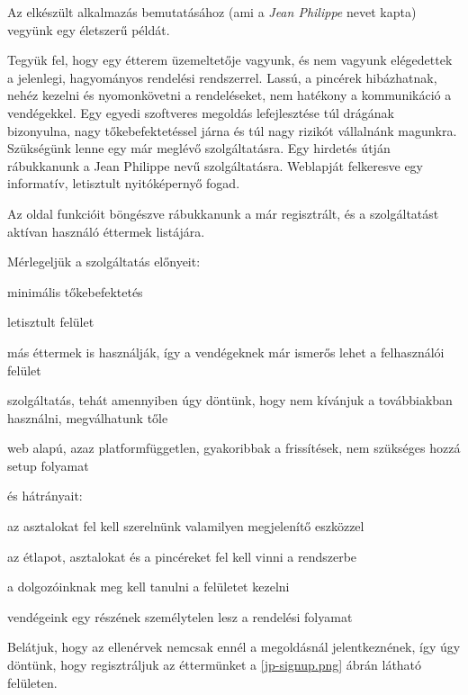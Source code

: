 Az elkészült alkalmazás bemutatásához (ami a \emph{Jean Philippe} nevet kapta) vegyünk egy életszerű példát. \par

Tegyük fel, hogy egy étterem üzemeltetője vagyunk, és nem vagyunk elégedettek a jelenlegi, hagyományos rendelési rendszerrel. Lassú, a pincérek hibázhatnak, nehéz kezelni és nyomonkövetni a rendeléseket, nem hatékony a kommunikáció a vendégekkel. Egy egyedi szoftveres megoldás lefejlesztése túl drágának bizonyulna, nagy tőkebefektetéssel járna és túl nagy rizikót vállalnánk magunkra. Szükségünk lenne egy már meglévő szolgáltatásra. Egy hirdetés útján rábukkanunk a Jean Philippe nevű szolgáltatásra. Weblapját felkeresve egy informatív, letisztult nyitóképernyő fogad. 


Az oldal funkcióit böngészve rábukkanunk a már regisztrált, és a szolgáltatást aktívan használó éttermek listájára.


Mérlegeljük a szolgáltatás előnyeit:

\begin{listing}
	\item minimális tőkebefektetés
	\item letisztult felület
	\item más éttermek is használják, így a vendégeknek már ismerős lehet a felhasználói felület
	\item szolgáltatás, tehát amennyiben úgy döntünk, hogy nem kívánjuk a továbbiakban használni, megválhatunk tőle
	\item web alapú, azaz platformfüggetlen, gyakoribbak a frissítések, nem szükséges hozzá setup folyamat
\end{listing}

és hátrányait:

\begin{listing}
	\item az asztalokat fel kell szerelnünk valamilyen megjelenítő eszközzel
	\item az étlapot, asztalokat és a pincéreket fel kell vinni a rendszerbe
	\item a dolgozóinknak meg kell tanulni a felületet kezelni
	\item vendégeink egy részének személytelen lesz a rendelési folyamat
\end{listing}

Belátjuk, hogy az ellenérvek nemcsak ennél a megoldásnál jelentkeznének, így úgy döntünk, hogy regisztráljuk az éttermünket a \ref{jp-signup.png} ábrán látható felületen.


